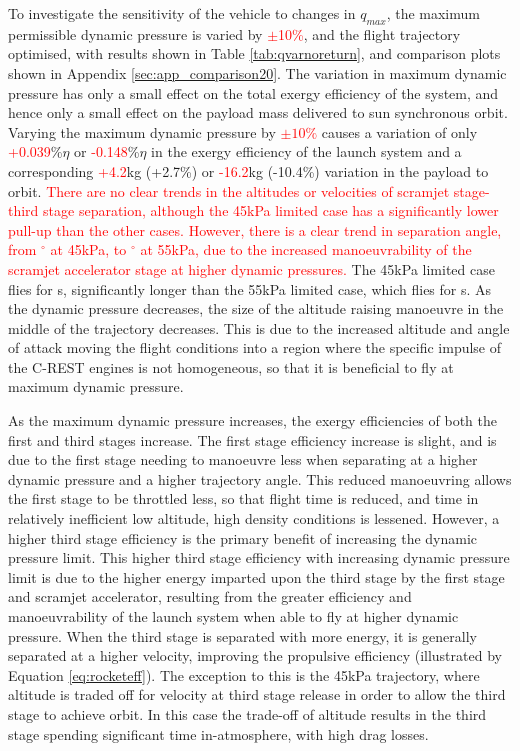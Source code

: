 To investigate the sensitivity of the vehicle to changes in $q_{max}$, the maximum permissible dynamic pressure is varied by \textcolor{red}{$\pm$10\%}, and the flight trajectory optimised, with results shown in Table \ref{tab:qvarnoreturn}, and comparison plots shown in Appendix \ref{sec:app_comparison20}.
The variation in maximum dynamic pressure has only a small effect on the total exergy efficiency of the system, and hence only a small effect on the payload mass delivered to sun synchronous orbit.  Varying the maximum dynamic pressure by \textcolor{red}{$\pm10\%$} causes a variation of only \textcolor{red}{+0.039}\%$\eta$ or \textcolor{red}{-0.148}\%$\eta$ in the exergy efficiency of the launch system and a corresponding \textcolor{red}{+4.2}kg (+2.7\%) or \textcolor{red}{-16.2}kg (-10.4\%) variation in the payload to orbit.  
\textcolor{red}{There are no clear trends in the altitudes or velocities of scramjet stage-third stage separation, although the 45kPa limited case has a significantly lower pull-up than the other cases. However, there is a clear trend in separation angle, from \secondthirdSeparationgammaqFortyFiveNoReturn $^\circ$ at 45kPa, to \secondthirdSeparationgammaqFiftyFiveNoReturn $^\circ$ at 55kPa, due to the increased manoeuvrability of the scramjet accelerator stage at higher dynamic pressures. }
The 45kPa limited case flies for \secondFlightTimeqFortyFiveNoReturn s, significantly longer than the 55kPa limited case, which flies for \secondFlightTimeqFiftyFiveNoReturn s.
As the dynamic pressure decreases, the size of the altitude raising manoeuvre in the middle of the trajectory decreases. This is due to the increased altitude and angle of attack moving the flight conditions into a region where the specific impulse of the C-REST engines is not homogeneous, so that it is beneficial to fly at maximum dynamic pressure.  

As the maximum dynamic pressure increases, the exergy efficiencies of both the first and third stages increase. The first stage efficiency increase is slight, and is due to the first stage needing to manoeuvre less when separating at a higher dynamic pressure and a higher trajectory angle. This reduced manoeuvring allows the first stage to be throttled less, so that flight time is reduced, and time in relatively inefficient low altitude, high density conditions is lessened. However, a higher third stage efficiency is the primary benefit of increasing the dynamic pressure limit. This higher third stage efficiency with increasing dynamic pressure limit is due to the higher energy imparted upon the third stage by the first stage and scramjet accelerator, resulting from the greater efficiency and manoeuvrability of the launch system when able to fly at higher dynamic pressure. When the third stage is separated with more energy, it is generally separated at a higher velocity, improving the propulsive efficiency (illustrated by Equation \ref{eq:rocketeff}). The exception to this is the 45kPa trajectory, where altitude is traded off for velocity at third stage release in order to allow the third stage to achieve orbit. In this case the trade-off of altitude results in the third stage spending significant time in-atmosphere, with high drag losses. 



